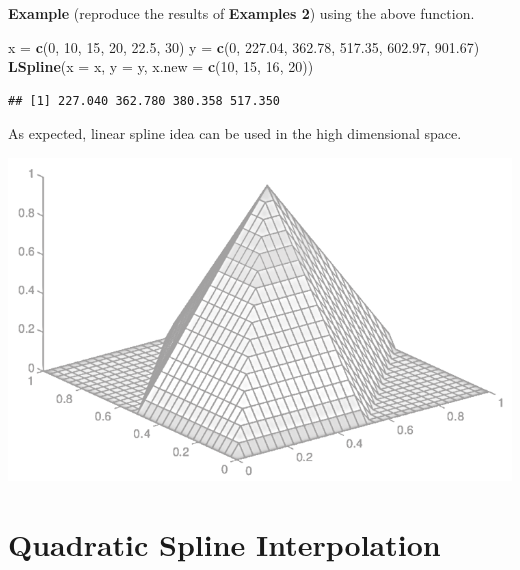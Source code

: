 \documentclass[
]{book}
\newenvironment{Shaded}{\begin{snugshade}}{\end{snugshade}}
\newcommand{\AttributeTok}[1]{\textcolor[rgb]{0.13,0.29,0.53}{#1}}
\newcommand{\DecValTok}[1]{\textcolor[rgb]{0.00,0.00,0.81}{#1}}
\newcommand{\FloatTok}[1]{\textcolor[rgb]{0.00,0.00,0.81}{#1}}
\newcommand{\FunctionTok}[1]{\textcolor[rgb]{0.13,0.29,0.53}{\textbf{#1}}}
\newcommand{\NormalTok}[1]{#1}
\newcommand{\OtherTok}[1]{\textcolor[rgb]{0.56,0.35,0.01}{#1}}
\begin{document}
\textbf{Example} (reproduce the results of \textbf{Examples 2}) using the above function.

\begin{Shaded}
\begin{Highlighting}[]
\NormalTok{x }\OtherTok{=} \FunctionTok{c}\NormalTok{(}\DecValTok{0}\NormalTok{, }\DecValTok{10}\NormalTok{, }\DecValTok{15}\NormalTok{, }\DecValTok{20}\NormalTok{, }\FloatTok{22.5}\NormalTok{, }\DecValTok{30}\NormalTok{)}
\NormalTok{y }\OtherTok{=} \FunctionTok{c}\NormalTok{(}\DecValTok{0}\NormalTok{, }\FloatTok{227.04}\NormalTok{, }\FloatTok{362.78}\NormalTok{, }\FloatTok{517.35}\NormalTok{, }\FloatTok{602.97}\NormalTok{, }\FloatTok{901.67}\NormalTok{)}
\FunctionTok{LSpline}\NormalTok{(}\AttributeTok{x =}\NormalTok{ x, }\AttributeTok{y =}\NormalTok{ y, }\AttributeTok{x.new =} \FunctionTok{c}\NormalTok{(}\DecValTok{10}\NormalTok{, }\DecValTok{15}\NormalTok{, }\DecValTok{16}\NormalTok{, }\DecValTok{20}\NormalTok{))}
\end{Highlighting}
\end{Shaded}

\begin{verbatim}
## [1] 227.040 362.780 380.358 517.350
\end{verbatim}

\hfill\break

As expected, linear spline idea can be used in the high dimensional space.

\begin{center}\includegraphics[width=0.6\linewidth]{img10/w10-linearInterpolation} \end{center}

\hfill\break

\hypertarget{quadratic-spline-interpolation}{%
\section{Quadratic Spline Interpolation}\label{quadratic-spline-interpolation}}
\end{document}
